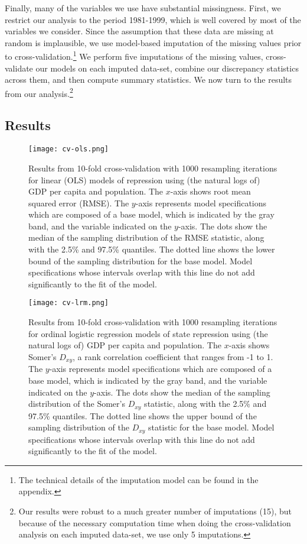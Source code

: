 \documentclass[12pt]{article}
\begin{document}
Finally, many of the variables we use have substantial missingness. First, we restrict our analysis to the period 1981-1999, which is well covered by most of the variables we consider. Since the assumption that these data are missing at random is implausible, we use model-based imputation of the missing values prior to cross-validation.\footnote{The technical details of the imputation model can be found in the appendix.} We perform five imputations of the missing values, cross-validate our models on each imputed data-set, combine our discrepancy statistics across them, and then compute summary statistics. We now turn to the results from our analysis.\footnote{Our results were robust to a much greater number of imputations (15), but because of the necessary computation time when doing the cross-validation analysis on each imputed data-set, we use only 5 imputations.}

\subsection{Results}

\begin{figure}[!htpb]
\centering
\texttt{[image: cv-ols.png]}
\caption{Results from 10-fold cross-validation with 1000 resampling iterations for linear (OLS) models of repression using (the natural logs of) GDP per capita and population. The $x$-axis shows root mean squared error (RMSE). The $y$-axis represents model specifications which are composed of a base model, which is indicated by the gray band, and the variable indicated on the $y$-axis. The dots show the median of the sampling distribution of the RMSE statistic, along with the 2.5\% and 97.5\% quantiles. The dotted line shows the lower bound of the sampling distribution for the base model. Model specifications whose intervals overlap with this line do not add significantly to the fit of the model.}
\label{fig:cv-ols}
\end{figure}

\begin{figure}[!htpb]
\centering
\texttt{[image: cv-lrm.png]}
\caption{Results from 10-fold cross-validation with 1000 resampling iterations for ordinal logistic regression models of state repression using (the natural logs of) GDP per capita and population. The $x$-axis shows Somer's $D_{xy}$, a rank correlation coefficient that ranges from -1 to 1. The $y$-axis represents model specifications which are composed of a base model, which is indicated by the gray band, and the variable indicated on the $y$-axis. The dots show the median of the sampling distribution of the Somer's $D_{xy}$ statistic, along with the 2.5\% and 97.5\% quantiles. The dotted line shows the upper bound of the sampling distribution of the $D_{xy}$ statistic for the base model. Model specifications whose intervals overlap with this line do not add significantly to the fit of the model.}
\label{fig:cv-lrm}
\end{figure}
\end{document}
